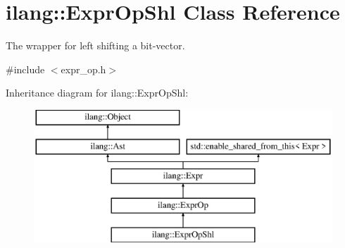 \hypertarget{classilang_1_1_expr_op_shl}{}\section{ilang\+:\+:Expr\+Op\+Shl Class Reference}
\label{classilang_1_1_expr_op_shl}


The wrapper for left shifting a bit-\/vector.  




{\ttfamily \#include $<$expr\+\_\+op.\+h$>$}

Inheritance diagram for ilang\+:\+:Expr\+Op\+Shl\+:\begin{figure}[H]
\begin{center}
\leavevmode
\includegraphics[height=5.000000cm]{classilang_1_1_expr_op_shl}
\end{center}
\end{figure}
